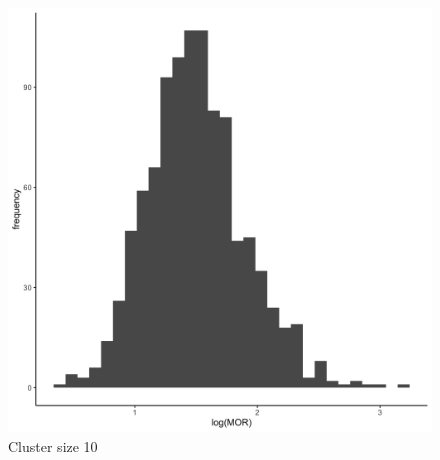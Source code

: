 \documentclass[
  letterpaper,
  DIV=11,
  numbers=noendperiod,
  titlepage]{scrartcl}
\begin{document}
\begin{figure}
\begin{minipage}[t]{0.24\linewidth}
{{\includegraphics{../../plots/two-lvl-ran-int/low-prev/hist_50_10_two_lvl_low_prev.png}

}

\caption{Cluster size 10}

}

\end{minipage}%
%
\begin{minipage}[t]{0.24\linewidth}

{\centering 

}
\end{minipage}
\end{figure}
\end{document}
